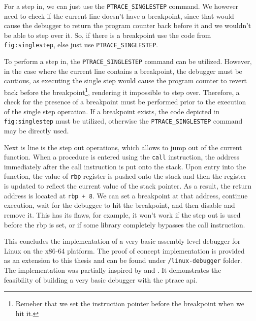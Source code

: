 For a step in, we can just use the \texttt{PTRACE\_SINGLESTEP}
command. We however need to check if the current line doesn't have a
breakpoint, since that would cause the debugger to return the program counter
back before it and we wouldn't be able to step over it. So, if there is a
breakpoint use the code from \texttt{fig:singlestep}, else just use
\texttt{PTRACE\_SINGLESTEP}.

To perform a step in, the \verb|PTRACE_SINGLESTEP| command can be utilized.
However, in the case where the current line contains a breakpoint, the debugger
must be cautious, as executing the single step would cause the program counter
to revert back before the breakpoint\footnote{Remeber that we set the
instruction pointer before the breakpoint when we hit it.}, rendering it
impossible to step over. Therefore, a check for the presence of a breakpoint
must be performed prior to the execution of the single step operation. If a
breakpoint exists, the code depicted in \texttt{fig:singlestep} must be
utilized, otherwise the \verb|PTRACE_SINGLESTEP| command may be directly
used.

Next is line is the step out operations, which allows to jump out of the
current function. When a procedure is entered using the \texttt{call}
instruction, the address immediately after the call instruction is put onto the
stack. Upon entry into the function, the value of \texttt{rbp} register is
pushed onto the stack and then the register is updated to reflect the current
value of the stack pointer. As a result, the return address is located at
\texttt{rbp + 8}. We can set a breakpoint at that address, continue execution,
wait for the debuggee to hit the breakpoint, and then disable and remove it.
This has its flaws, for example, it won't work if the step out is used before
the rbp is set, or if some library completely bypasses the call instruction.

This concludes the implementation of a very basic assembly level debugger for
Linux on the x86-64 platform. The proof of concept implementation is provided
as an extension to this thesis and can be found under \texttt{/linux-debugger}
folder. The implementation was partially inspired by \cite{linux-debugger-blog}
and \cite{lldb}. It demonstrates the feasibility of building a very basic
debugger with the ptrace api.

